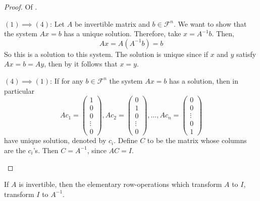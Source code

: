 \begin{proof}
	Of .
	\begin{flushleft}
		$(1)\implies(4)$: Let $A$ be invertible matrix and $b\in\mathcal{F}^n$.
		We want to show that the system $Ax=b$ has a unique solution. Therefore,
		take $x=A^{-1}b$. Then,
		\begin{equation*}
			Ax = A(A^{-1}b)=b
		\end{equation*}
		So this is a solution to this system. The solution is unique since if
		$x$ and $y$ satisfy $Ax=b=Ay$, then by 
		it follows that $x=y$.
	\end{flushleft}
	\begin{flushleft}
		$(4)\implies(1)$: If for any $b\in\mathcal{F}^n$ the system $Ax=b$ has a
		solution, then in particular
		\begin{equation*}
			Ac_1=\begin{pmatrix}
				1      \\
				0      \\
				0      \\
				\vdots \\
				0
			\end{pmatrix},
			Ac_2=\begin{pmatrix}
				0      \\
				1      \\
				0      \\
				\vdots \\
				0
			\end{pmatrix},
			\dots,
			Ac_n=\begin{pmatrix}
				0      \\
				0      \\
				\vdots \\
				0      \\
				1
			\end{pmatrix}
		\end{equation*}
		have unique solution, denoted by $c_i$. Define $C$ to be the matrix
		whose columns are the $c_i$'s. Then $C=A^{-1}$, since $AC=I$.
	\end{flushleft}
\end{proof}

\begin{thm}\label{thm-finding-inverse-matrices}
	If $A$ is invertible, then the elementary row-operations which transform $A$
	to $I$, transform $I$ to $A^{-1}$.
\end{thm}

